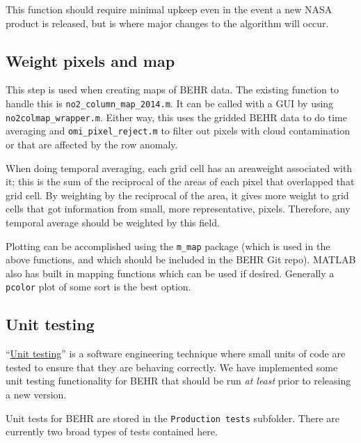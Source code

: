 \documentclass[12pt]{article}
\begin{document}
		This function should require minimal upkeep even in the event a new NASA product is released, but is where major changes to the algorithm will occur.
		
	\subsection{Weight pixels and map}
	This step is used when creating maps of BEHR  data. The existing function to handle this is \lstinline$no2_column_map_2014.m$. It can be called with a GUI by using \lstinline$no2colmap_wrapper.m$. Either way, this uses the gridded BEHR data to do time averaging and \lstinline$omi_pixel_reject.m$ to filter out pixels with cloud contamination or that are affected by the row anomaly.
	
	When doing temporal averaging, each grid cell has an areaweight associated with it; this is the sum of the reciprocal of the areas of each pixel that overlapped that grid cell. By weighting by the reciprocal of the area, it gives more weight to grid cells that got information from small, more representative, pixels.  Therefore, any temporal average should be weighted by this field.
	
	Plotting can be accomplished using the \lstinline$m_map$ package (which is used in the above functions, and which should be included in the BEHR Git repo). MATLAB also has built in mapping functions which can be used if desired. Generally a \lstinline$pcolor$ plot of some sort is the best option.
	
	\subsection{Unit testing}\label{sec:unit-testing}
	``\href{https://en.wikipedia.org/wiki/Unit_testing}{Unit testing}'' is a software engineering technique where small units of code are tested to ensure that they are behaving correctly. We have implemented some unit testing functionality for BEHR that should be run \emph{at least} prior to releasing a new version.  
	
	Unit tests for BEHR are stored in the \lstinline$Production tests$ subfolder. There are currently two broad types of tests contained here.
\end{document}
